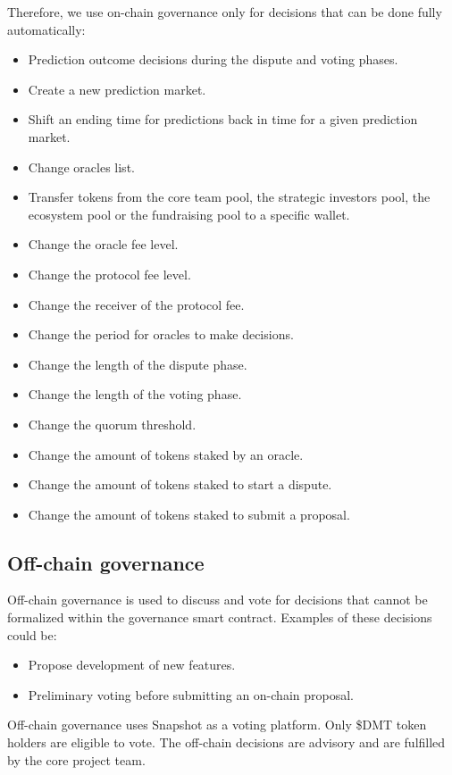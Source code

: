 \documentclass[12pt]{article}
\begin{document}
Therefore, we use on-chain governance only for decisions that can be done fully automatically:
\begin{itemize}
\item Prediction outcome decisions during the dispute and voting phases.
\item Create a new prediction market.
\item Shift an ending time for predictions back in time for a given prediction market.
\item Change oracles list.
\item Transfer tokens from the core team pool, the strategic investors pool, the ecosystem pool or the fundraising pool to a specific wallet.
\item Change the oracle fee level.
\item Change the protocol fee level.
\item Change the receiver of the protocol fee.
\item Change the period for oracles to make decisions.
\item Change the length of the dispute phase.
\item Change the length of the voting phase.
\item Change the quorum threshold.
\item Change the amount of tokens staked by an oracle.
\item Change the amount of tokens staked to start a dispute.
\item Change the amount of tokens staked to submit a proposal.
\end{itemize}

\subsection{Off-chain governance}
Off-chain governance is used to discuss and vote for decisions that cannot be formalized within the governance smart contract. Examples of these decisions could be:
\begin{itemize}
\item Propose development of new features.
\item Preliminary voting before submitting an on-chain proposal.
\end{itemize}

Off-chain governance uses Snapshot as a voting platform. Only \$DMT token holders are eligible to vote. The off-chain decisions are advisory and are fulfilled by the core project team.
\pagebreak
\end{document}
